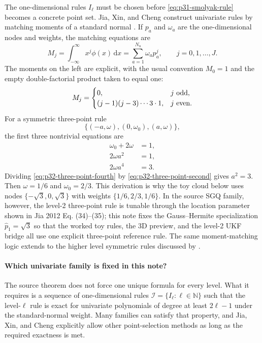 \documentclass[11pt]{article}
\numberwithin{equation}{section}
\newcommand{\dd}{\,\mathrm d}
\begin{document}
The one-dimensional rules \(I_\ell\) must be chosen before
\eqref{eq:p31-smolyak-rule} becomes a concrete point set.  Jia, Xin, and Cheng
construct univariate rules by matching moments of a standard normal
\cite[Section 3.2]{jia2012sparsegrid}.  If \(p_a\) and \(\omega_a\) are the
one-dimensional nodes and weights, the matching equations are
\begin{equation}
  M_j
  =
  \int_{-\infty}^{\infty}x^j\phi(x)\dd x
  =
  \sum_{a=1}^{N_u}\omega_a p_a^j,
  \qquad j=0,1,\ldots,J.
  \label{eq:p32-univariate-moment-match}
\end{equation}
The moments on the left are explicit, with the usual convention
\(M_0=1\) and the empty double-factorial product taken to equal one:
\begin{equation}
  M_j=
  \begin{cases}
  0, & j\ \hbox{odd},\\
  (j-1)(j-3)\cdots 3\cdot 1, & j\ \hbox{even}.
  \end{cases}
  \label{eq:p32-normal-moments}
\end{equation}
For a symmetric three-point rule
\[
  \{(-a,\omega),(0,\omega_0),(a,\omega)\},
\]
the first three nontrivial equations are
\begin{align}
  \omega_0+2\omega&=1,
  \label{eq:p32-three-point-mass}\\
  2\omega a^2&=1,
  \label{eq:p32-three-point-second}\\
  2\omega a^4&=3.
  \label{eq:p32-three-point-fourth}
\end{align}
Dividing \eqref{eq:p32-three-point-fourth} by
\eqref{eq:p32-three-point-second} gives \(a^2=3\).  Then
\(\omega=1/6\) and \(\omega_0=2/3\).  This derivation is why the toy cloud
below uses nodes \(\{-\sqrt3,0,\sqrt3\}\) with weights
\(\{1/6,2/3,1/6\}\).  In the source SGQ family, however, the level-2 three-point
rule is tunable through the location parameter shown in Jia 2012 Eq. (34)--(35);
this note fixes the Gauss--Hermite specialization \(\hat p_1=\sqrt3\) so that
the worked toy rules, the 3D preview, and the level-2 UKF bridge all use one
explicit three-point reference rule.  The same moment-matching logic extends to
the higher level symmetric rules discussed by
\citet[Section 3.2]{jia2012sparsegrid}.

\paragraph{Which univariate family is fixed in this note?}
The source theorem does not force one unique formula for every level.  What it
requires is a sequence of one-dimensional rules
\(
  \mathcal I=\{I_\ell:\ell\in\mathbb N\}
\)
such that the level-\(\ell\) rule is exact for univariate polynomials of degree
at least \(2\ell-1\) under the standard-normal weight.  Many families can satisfy
that property, and Jia, Xin, and Cheng explicitly allow other point-selection
methods as long as the required exactness is met.
\end{document}
